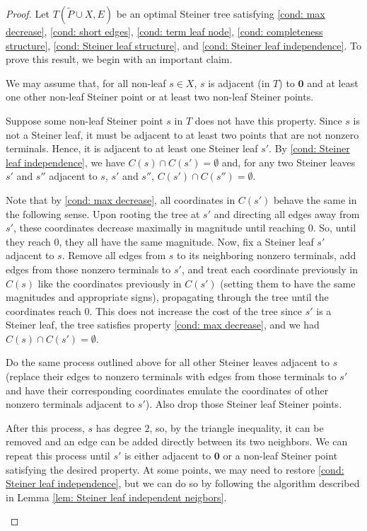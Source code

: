 \documentclass{article}\providecommand{\DeclareRedundantLanguages}[2]{}\usepackage[a4paper,margin=20mm]{geometry}
\newcommand{\1}{\textbf{1}}
\renewcommand{\tilde}{\widetilde}
\begin{document}
\begin{proof}
Let $T(\tilde{P} \cup X, E)$ be an optimal Steiner tree satisfying \ref{cond: max decrease}, \ref{cond: short edges}, \ref{cond: term leaf node}, \ref{cond: completeness structure}, \ref{cond: Steiner leaf structure}, and \ref{cond: Steiner leaf independence}. To prove this result, we begin with an important claim.
\begin{claim}
We may assume that, for all non-leaf $s \in X$, $s$ is adjacent (in $T$) to $\mathbf{0}$ and at least one other non-leaf Steiner point or at least two non-leaf Steiner points.
\end{claim}
\begin{subproof}
Suppose some non-leaf Steiner point $s$ in $T$ does not have this property. Since $s$ is not a Steiner leaf, it must be adjacent to at least two points that are not nonzero terminals. Hence, it is adjacent to at least one Steiner leaf $s'$. By \ref{cond: Steiner leaf independence}, we have $C(s) \cap C(s') = \emptyset$ and, for any two Steiner leaves $s'$ and $s''$ adjacent to $s$,  $s'$ and $s''$, $C(s') \cap C(s'') = \emptyset$. 

Note that by \ref{cond: max decrease}, all coordinates in $C(s')$ behave the same in the following sense. Upon rooting the tree at $s'$ and directing all edges away from $s'$, these coordinates decrease maximally in magnitude until reaching $0$. So, until they reach $0$, they all have the same magnitude. Now, fix a Steiner leaf $s'$ adjacent to $s$. Remove all edges from $s$ to its neighboring nonzero terminals, add edges from those nonzero terminals to $s'$, and treat each coordinate previously in $C(s)$ like the coordinates previously in $C(s')$ (setting them to have the same magnitudes and appropriate signs), propagating through the tree until the coordinates reach $0$. This does not increase the cost of the tree since $s'$ is a Steiner leaf, the tree satisfies property \ref{cond: max decrease}, and we had $C(s) \cap C(s') = \emptyset$.

Do the same process outlined above for all other Steiner leaves adjacent to $s$ (replace their edges to nonzero terminals with edges from those terminals to $s'$ and have their corresponding coordinates emulate the coordinates of other nonzero terminals adjacent to $s'$). Also drop those Steiner leaf Steiner points.

After this process, $s$ has degree $2$, so, by the triangle inequality, it can be removed and an edge can be added directly between its two neighbors. We can repeat this process until $s'$ is either adjacent to $\mathbf{0}$ or a non-leaf Steiner point satisfying the desired property. At some points, we may need to restore \ref{cond: Steiner leaf independence}, but we can do so by following the algorithm described in Lemma \ref{lem: Steiner leaf independent neigbors}.


\end{subproof}
\end{proof}
\end{document}
